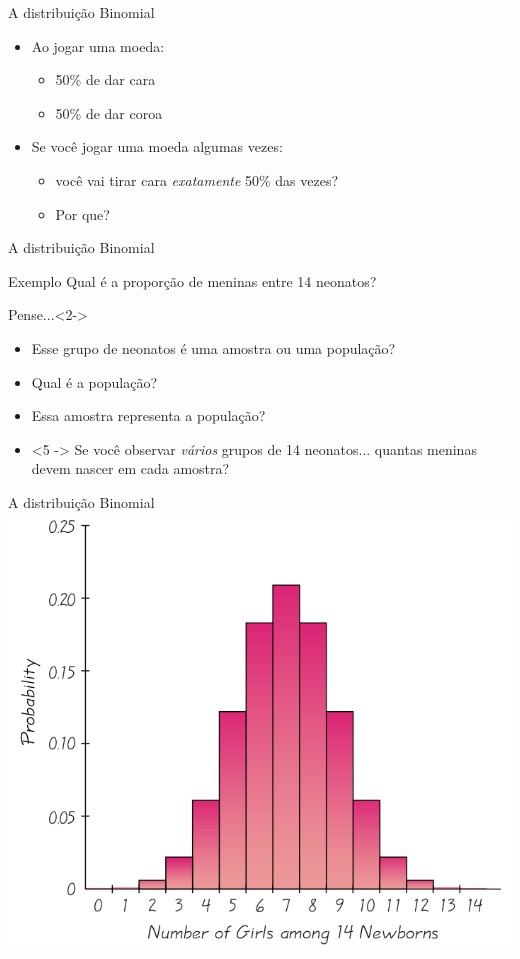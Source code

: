 \documentclass{beamer}
\begin{document}
\begin{frame}{A distribuição Binomial}
  \begin{itemize}
  \item Ao jogar uma moeda:
    \begin{itemize}
    \item 50\% de dar cara
    \item 50\% de dar coroa
    \end{itemize}
  \item Se \alert{você} jogar uma moeda  algumas vezes:
    \begin{itemize}
    \item você vai tirar cara {\em exatamente} 50\% das vezes?
    \item Por que?
    \end{itemize}
  \end{itemize}
\end{frame}

\begin{frame}{A distribuição Binomial}
  \begin{exampleblock}{Exemplo}
    Qual é a proporção de meninas entre 14 neonatos?
  \end{exampleblock}
  \begin{block}{Pense...}<2->
    \begin{itemize}
    \item Esse grupo de neonatos é uma amostra ou uma população?
    \item<3-> Qual é a população?
    \item<4-> Essa amostra \alert{representa} a população?
    \item<5
      -> Se você observar {\em vários} grupos de 14 neonatos... quantas meninas devem nascer em cada amostra?
    \end{itemize}
  \end{block}

\end{frame}

\begin{frame}{A distribuição Binomial}
  \includegraphics[height=\textheight]{Prob_II/discreta}
\end{frame}
\end{document}
